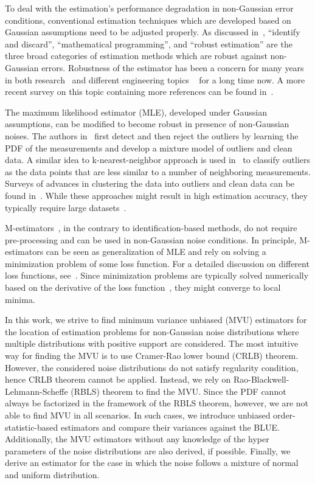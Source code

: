 \documentclass[journal]{IEEEtran}
\begin{document}
To deal with the estimation's performance degradation in non-Gaussian error conditions, conventional estimation techniques which are developed based on Gaussian assumptions need to be adjusted properly. As discussed in~\cite{article:ITSP_yin_13}, ``identify and discard'', ``mathematical programming'', and ``robust estimation'' are the three broad categories of estimation methods which are robust against non-Gaussian errors. Robustness of the estimator has been a concern for many years in both research~\cite{article:JASA_stigler_73} and different engineering topics ~\cite{article:PI_kassam_85,book:SDNGN_kassam,article:SIAM_stewart_99,book:NSP_arce} for a long time now. A more recent survey on this topic containing more references can be found in~\cite{article:ISPM_zoubir_12}.

The maximum likelihood estimator (MLE), developed under Gaussian assumptions, can be modified to become robust in presence of non-Gaussian noises. The authors in~\cite{conf:ICML_eskin_00} first detect and then reject the outliers by learning the PDF of the measurements and develop a mixture model of outliers and clean data. A similar idea to k-nearest-neighbor approach is used in~\cite{article:DMKD_chawla_10} to classify outliers as the data points that are less similar to a number of neighboring measurements. Surveys of advances in clustering the data into outliers and clean data can be found in~\cite{article:AIR_hodge_04,article:ITSP_yin_13,conf:ICASSP_fritsche_09}. While these approaches might result in high estimation accuracy, they typically require large datasets~\cite{article:ISPM_zoubir_12}.

M-estimators~\cite{book:RS_huber}, in the contrary to identification-based methods, do not require pre-processing and can be used in non-Gaussian noise conditions. In principle, M-estimators can be seen as generalization of MLE and rely on solving a minimization problem of some loss function. For a detailed discussion on different loss functions, see~\cite{book:RS_huber}. Since minimization problems are typically solved numerically based on the derivative of the loss function~\cite{book:RSTM_maronna}, they might converge to local minima.

In this work, we strive to find minimum variance unbiased (MVU) estimators for the location of estimation problems for non-Gaussian noise distributions where multiple distributions with positive support are considered. The most intuitive way for finding the MVU is to use Cramer-Rao lower bound (CRLB) theorem. However, the considered noise distributions do not satisfy regularity condition, hence CRLB theorem cannot be applied. Instead, we rely on  Rao-Blackwell-Lehmann-Scheffe (RBLS) theorem to find the MVU. Since the PDF cannot always be factorized in the framework of the RBLS theorem, however, we are not able to find MVU in all scenarios. In such cases, we introduce unbiased order-statistic-based estimators and compare their variances against the BLUE. Additionally, the MVU estimators without any knowledge of the hyper parameters of the noise distributions are also derived, if possible. Finally, we derive an estimator for the case in which the noise follows a mixture of normal and uniform distribution.
\end{document}
